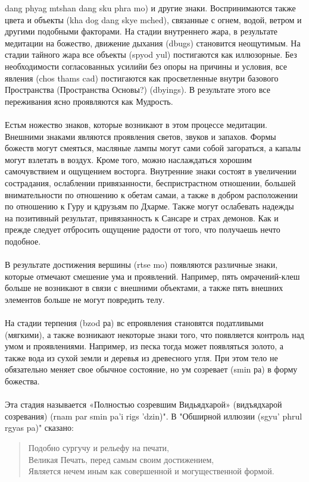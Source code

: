 dang phyag mtshan dang sku phra mo) и другие знаки. Воспринимаются также цвета и объекты
(kha dog dang skye mched), связанные с огнем, водой, ветром и другими подобными
факторами. На стадии внутреннего жара, в результате медитации на божество, движение
дыхания (dbugs) становится неощутимым. На стадии тайного жара все объекты (spyod yul)
постигаются как иллюзорные. Без необходимости согласованных усилийи без опоры на
причины и условия, все явления (chos thams cad) постигаются как просветленные внутри
базового Пространства (Пространства Основы?) (dbyings). В результате этого все
переживания ясно проявляются как Мудрость.\\
\\
Естьм ножество знаков, которые возникают в этом процессе медитации. Внешними
знаками являются проявления светов, звуков и запахов. Формы божеств могут смеяться,
масляные лампы могут сами собой загораться, а капалы могут взлетать в воздух. Кроме того,
можно наслаждаться хорошим самочувствием и ощущением восторга. Внутренние знаки
состоят в увеличении сострадания, ослаблении привязанности, беспристрастном отношении,
большей внимательности по отношению к обетам самаи, а также в добром расположении по
отношению к Гуру и кдрузьям по Дхарме. Также могут ослабевать надежды на позитивный
результат, привязанность к Сансаре и страх демонов. Как и прежде следует отбросить
ощущение радости от того, что получаешь нечто подобное.\\
\\
В результате достижения вершины (rtse mo) появляются различные знаки, которые
отмечают смешение ума и проявлений. Например, пять омрачений-клеш больше не
возникают в связи с внешними объектами, а также пять внешних элементов больше не могут
повредить телу.\\
\\
На стадии терпения (bzod ра) вс епроявления становятся податливыми (мягкими), а
также возникают некоторые знаки того, что появляется контроль над умом и проявлениями.
Например, из песка тогда может появляться золото, а также вода из сухой земли и деревья из
древесного угля. При этом тело не обязательно меняет свое обычное состояние, но ум
созревает (smin ра) в форму божества.\\
\\
Эта стадия называется «Полностью созревшим Видьядхарой» (видъядхарой созревания)
(rnam par smin pa'i rigs 'dzin)". В "Обширной иллюзии (sgyu' phrul rgyas pa)"
сказано:

\begin{verse}
Подобно сургучу и рельефу на печати,\\
Великая Печать, перед самым своим достижением,\\
Является нечем иным как совершенной и могущественной формой.
\end{verse}

